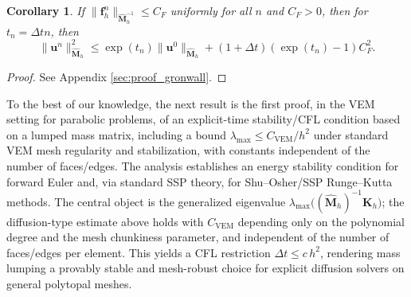 \documentclass{article}
\newtheorem{cor}{Corollary}[section]
\renewcommand{\u}{\mathbf{u}}
\newcommand{\M}{\hat{\mathbf{M}}_h}
\begin{document}
\begin{cor}\label{cor:gronwall_consequence}
    If $\| \mathbf{f}_h^n\|_{\M^{-1}} \leq C_F$ uniformly for all $n$ and $C_F > 0$, then for $t_n = \Delta t n$, then
    \begin{equation}
        \nonumber
        \| \u^n \|^2_{\M} \leq \exp (t_n) \| \u^0 \|_{\M} + (1 + \Delta t)(\exp(t_n)-1)C_F^2.
    \end{equation}
\end{cor}

\begin{proof}
    See Appendix \ref{sec:proof_gronwall}.
\end{proof}

To the best of our knowledge, the next result is the first proof, in the VEM setting for parabolic problems, of an explicit-time stability/CFL condition based on a lumped mass matrix, including a bound $\lambda_{\max}\!\le C_{\text{VEM}}/h^2$ under standard VEM mesh regularity and stabilization, with constants independent of the number of faces/edges. The analysis establishes an energy stability condition for forward Euler and, via standard SSP theory, for Shu--Osher/SSP Runge--Kutta methods. The central object is the generalized eigenvalue $\lambda_{\max}\big((\hat{\mathbf{M}}_h)^{-1}\mathbf{K}_h\big)$; the diffusion-type estimate above holds with $C_{\mathrm{VEM}}$ depending only on the polynomial degree and the mesh chunkiness parameter, and independent of the number of faces/edges per element. This yields a CFL restriction $\Delta t \le c\, h^2$, rendering mass lumping a provably stable and mesh-robust choice for explicit diffusion solvers on general polytopal meshes.
\end{document}
